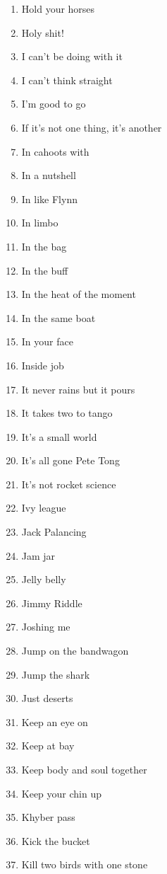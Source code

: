 \begin{enumerate}
        \item  Hold your horses
        \item  Holy shit!
        \item  I can't be doing with it
        \item  I can't think straight
        \item  I'm good to go
        \item  If it's not one thing, it's another
        \item  In cahoots with
        \item  In a nutshell
        \item  In like Flynn
        \item  In limbo
        \item  In the bag
        \item  In the buff
        \item  In the heat of the moment
        \item  In the same boat
        \item  In your face
        \item  Inside job
        \item  It never rains but it pours
        \item  It takes two to tango
        \item  It's a small world
        \item  It's all gone Pete Tong
        \item  It's not rocket science
        \item  Ivy league
        \item  Jack Palancing
        \item  Jam jar
        \item  Jelly belly
        \item  Jimmy Riddle
        \item  Joshing me
        \item  Jump on the bandwagon
        \item  Jump the shark
        \item  Just deserts
        \item  Keep an eye on
        \item  Keep at bay
        \item  Keep body and soul together
        \item  Keep your chin up
        \item  Khyber pass
        \item  Kick the bucket
        \item  Kill two birds with one stone

\end{enumerate}
